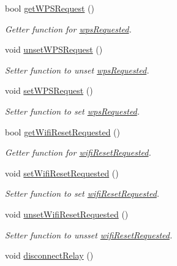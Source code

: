 \begin{DoxyCompactItemize}
bool \hyperlink{WIFIOnOff_8ino_a3361cdf5888fc635d5ae5d83747d50d6}{get\-W\-P\-S\-Request} ()
\begin{DoxyCompactList}\small\item\em Getter function for \hyperlink{WIFIOnOff_8ino_a002d6cec57f207948ee9f62a3fbc12fe}{wps\-Requested}. \end{DoxyCompactList}\item 
void \hyperlink{WIFIOnOff_8ino_a86eebd69aeee5bbb5e648fc099b4b360}{unset\-W\-P\-S\-Request} ()
\begin{DoxyCompactList}\small\item\em Setter function to unset \hyperlink{WIFIOnOff_8ino_a002d6cec57f207948ee9f62a3fbc12fe}{wps\-Requested}. \end{DoxyCompactList}\item 
void \hyperlink{WIFIOnOff_8ino_af2a784e9ea129440dd303530ab9e97a1}{set\-W\-P\-S\-Request} ()
\begin{DoxyCompactList}\small\item\em Setter function to set \hyperlink{WIFIOnOff_8ino_a002d6cec57f207948ee9f62a3fbc12fe}{wps\-Requested}. \end{DoxyCompactList}\item 
bool \hyperlink{WIFIOnOff_8ino_aa79761488d06c15b10258afefb215020}{get\-Wifi\-Reset\-Requested} ()
\begin{DoxyCompactList}\small\item\em Getter function for \hyperlink{WIFIOnOff_8ino_a1ef1b3b96ca3b7c432a5c202037bcd43}{wifi\-Reset\-Requested}. \end{DoxyCompactList}\item 
void \hyperlink{WIFIOnOff_8ino_a359226c1dba04041902ec5451ada2aae}{set\-Wifi\-Reset\-Requested} ()
\begin{DoxyCompactList}\small\item\em Setter function to set \hyperlink{WIFIOnOff_8ino_a1ef1b3b96ca3b7c432a5c202037bcd43}{wifi\-Reset\-Requested}. \end{DoxyCompactList}\item 
void \hyperlink{WIFIOnOff_8ino_a0e963d26058822266a054c999cf33ece}{unset\-Wifi\-Reset\-Requested} ()
\begin{DoxyCompactList}\small\item\em Setter function to unsset \hyperlink{WIFIOnOff_8ino_a1ef1b3b96ca3b7c432a5c202037bcd43}{wifi\-Reset\-Requested}. \end{DoxyCompactList}\item 
void \hyperlink{WIFIOnOff_8ino_ae850a8f5a550a31d8433eddf41a11d44}{disconnect\-Relay} ()

\end{DoxyCompactItemize}
